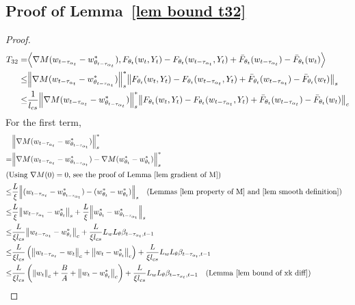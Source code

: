 \documentclass[twoside,11pt]{article}
\newcommand{\indot}[2]{{\left<#1, #2\right>}}
\numberwithin{assucounter}{section}
\begin{document}
\subsection{Proof of Lemma~\ref{lem bound t32}}
\label{sec proof lem bound t32}
\lemboundtthreetwo*
\begin{proof}
  \begin{align}
T_{32} = &\indot{\nabla M(w_{t-\tau_{\alpha_t}} - w^*_{\theta_{t-\tau_{\alpha_t}}})}{F_{\theta_t}(w_t, Y_t) - F_{\theta_t}(w_{t- \tau_{\alpha_t}}, Y_t) + \bar F_{\theta_t}(w_{t- \tau_{\alpha_t}}) - \bar F_{\theta_t}(w_t)} \\
\leq & \norm{\nabla M(w_{t-\tau_{\alpha_t}} - w^*_{\theta_{t-\tau_{\alpha_t}}})}_s^*\norm{F_{\theta_t}(w_t, Y_t) - F_{\theta_t}(w_{t- \tau_{\alpha_t}}, Y_t) + \bar F_{\theta_t}(w_{t- \tau_{\alpha_t}}) - \bar F_{\theta_t}(w_t)}_s \\
\leq & \frac{1}{l_{cs}} \norm{\nabla M(w_{t-\tau_{\alpha_t}} - w^*_{\theta_{t-\tau_{\alpha_t}}})}_s^*\norm{F_{\theta_t}(w_t, Y_t) - F_{\theta_t}(w_{t- \tau_{\alpha_t}}, Y_t) + \bar F_{\theta_t}(w_{t- \tau_{\alpha_t}}) - \bar F_{\theta_t}(w_t)}_c
  \end{align}
For the first term,
\begin{align}
  \label{eq gradient bound dual norm}
  &\norm{\nabla M(w_{t-\tau_{\alpha_t}} - w^*_{\theta_{t-\tau_{\alpha_t}}})}_s^* \\
  =&\norm{\nabla M(w_{t-\tau_{\alpha_t}} - w^*_{\theta_{t-\tau_{\alpha_t}}}) - \nabla M(w^*_{\theta_t} - w^*_{\theta_t})}_s^*  \\
  \intertext{\hfill (Using $\nabla M(0) = 0$, see the proof of Lemma~\ref{lem gradient of M})}
  \leq&\frac{L}{\xi}\norm{(w_{t-\tau_{\alpha_t}} - w^*_{\theta_{t-\tau_{\alpha_t}}}) - (w^*_{\theta_t} - w^*_{\theta_t})}_s \qq{(Lemmas~\ref{lem property of M} and \ref{lem smooth definition})}\\
  \leq& \frac{L}{\xi} \norm{w_{t-\tau_{\alpha_t}} - w^*_{\theta_t}}_s + \frac{L}{\xi} \norm{w^*_{\theta_t} - w^*_{\theta_{t-\tau_{\alpha_t}}}}_s  \\
  \leq& \frac{L }{\xi l_{cs}} \norm{w_{t-\tau_{\alpha_t}} - w^*_{\theta_t}}_c + \frac{L}{\xi l_{cs}} L_w L_\theta \beta_{t-\tau_{\alpha_t}, t-1} \\
  \leq& \frac{L }{\xi l_{cs}}\left(\norm{w_{t-\tau_{\alpha_t}} - w_t}_c + \norm{w_t - w^*_{\theta_t}}_c \right)+ \frac{L}{\xi l_{cs}} L_w L_\theta \beta_{t-\tau_{\alpha_t}, t-1} \\
  \leq& \frac{L}{\xi l_{cs}}\left(\norm{w_t}_c + \frac{B}{A} + \norm{w_t - w^*_{\theta_t}}_c \right)+ \frac{L}{\xi l_{cs}} L_w L_\theta \beta_{t-\tau_{\alpha_t}, t-1} \qq{(Lemma \ref{lem bound of xk diff})} \\

\end{align}
\end{proof}
\end{document}
